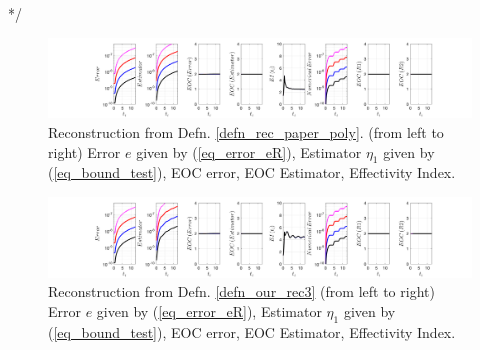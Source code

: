 \documentclass[12pt,a4paper]{article}
\numberwithin{equation}{section}
\theoremstyle{definition}
\begin{document}
*/
\begin{figure}[H]
	\hspace{-3cm}
	\includegraphics[scale=0.55]{fig_LeapFrogplots_1x5_sin_IC_harmonic_u9_v1_paperrec_poly_our_res}	
	\caption{Reconstruction from Defn. \ref{defn_rec_paper_poly}. (from left to right) Error $e$ given by (\ref{eq_error_eR}), Estimator $\eta_1$ given by (\ref{eq_bound_test}), EOC error, EOC Estimator, Effectivity Index.}
	\label{fig_all_in_one_paperrec_poly_u09_v01}
\end{figure}
\begin{figure}[H]
	\hspace{-3cm}
	\includegraphics[scale=0.55]{fig_LeapFrogplots_1x5_sin_IC_harmonic_u9_v1_paperrec_poly_tristan}	
\caption{Reconstruction from Defn. \ref{defn_our_rec3} (from left to right) Error $e$ given by (\ref{eq_error_eR}), Estimator $\eta_1$ given by (\ref{eq_bound_test}), EOC error, EOC Estimator, Effectivity Index.}
	\label{fig_all_in_one_paperrec_poly_tristan_u9_v1}
\end{figure}
\end{document}
